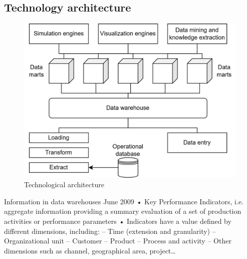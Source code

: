 \subsection{Technology architecture}
\begin{figure}[H]
    \centering
    \includegraphics[width=0.5\linewidth]{images/bis4.png}
    \caption{Technological architecture}
\end{figure}
Information in data warehouses
June 2009
• Key Performance Indicators, i.e. aggregate information providing a summary
evaluation of a set of production activities or performance parameters
• Indicators have a value defined by different dimensions, including:
– Time (extension and granularity)
– Organizational unit
– Customer
– Product
– Process and activity
– Other dimensions such as channel, geographical area, project…

